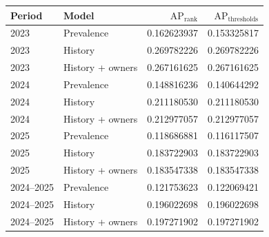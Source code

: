 \begin{tabular}{@{}llrr@{}}
\toprule
Period & Model & $\mathrm{AP}_{\mathrm{rank}}$ & $\mathrm{AP}_{\mathrm{thresholds}}$\\
\midrule
2023 & Prevalence & 0.162623937 & 0.153325817\\
2023 & History & 0.269782226 & 0.269782226\\
2023 & History + owners & 0.267161625 & 0.267161625\\
2024 & Prevalence & 0.148816236 & 0.140644292\\
2024 & History & 0.211180530 & 0.211180530\\
2024 & History + owners & 0.212977057 & 0.212977057\\
2025 & Prevalence & 0.118686881 & 0.116117507\\
2025 & History & 0.183722903 & 0.183722903\\
2025 & History + owners & 0.183547338 & 0.183547338\\
2024--2025 & Prevalence & 0.121753623 & 0.122069421\\
2024--2025 & History & 0.196022698 & 0.196022698\\
2024--2025 & History + owners & 0.197271902 & 0.197271902\\
\bottomrule
\end{tabular}
